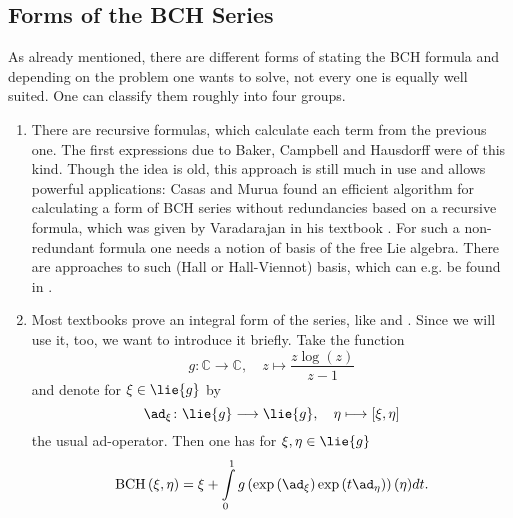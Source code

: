 \subsection{Forms of the BCH Series}
As already mentioned, there are different forms of stating the BCH formula 
and depending on the problem one wants to solve, not every one is equally 
well suited. One can classify them roughly into four groups.
\begin{enumerate}
	\item
	There are recursive formulas, which calculate each term from the 
	previous one. The first expressions due to Baker, Campbell and Hausdorff 
	were of this kind. Though the idea is old, this approach is still much in
	use and allows powerful applications: Casas and Murua found an 
	efficient algorithm \cite{casas.murua:2009a} for calculating 	a form of 
	BCH series without redundancies based on a recursive formula, which was 
	given by Varadarajan in his textbook \cite{varadarajan:1974a}. 
	For such a non-redundant formula one needs a notion of basis of the free 
	Lie algebra. There are approaches to such (Hall or Hall-Viennot) basis, 
	which can e.g. be found in \cite{serre:2006a}.
	
	\item
	Most textbooks prove an integral form of the series, like 
	\cite{hall:2003a} and \cite{hilgert.neeb:2012a}. Since we will use it, 
	too, we want to introduce it briefly. Take the function
	\begin{equation}
		\label{Alg:DefinitionLogBernoullis}
		g \colon 
		\mathbb{C}
		\longrightarrow
		\mathbb{C},
		\quad
		z 
		\longmapsto
		\frac{ z \log(z) }{z - 1}
	\end{equation}
	and denote for $\xi \in \lie{g}$ by
	\begin{equation*}
		\ad_{\xi}
		\colon
		\lie{g}
		\longrightarrow
		\lie{g},
		\quad
		\eta
		\longmapsto
		[\xi, \eta]
	\end{equation*}
	the usual ad-operator. Then one has for $\xi, \eta \in \lie{g}$
	\begin{equation}
		\label{Alg:BCHinIntegral}
		\bch{\xi}{\eta}
		=
		\xi + 
		\int\limits_0^1
		g \left( 
			\exp \left(
				\ad_{\xi}
			\right)
			\exp \left(
				t \ad_{\eta}
			\right)
		\right)
		(\eta) 
		dt.
	\end{equation}
	

\end{enumerate}
